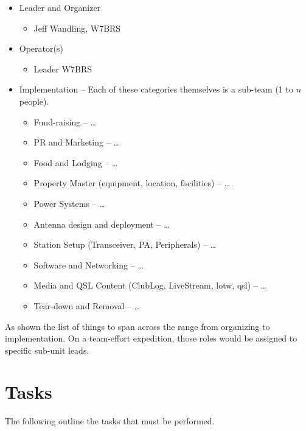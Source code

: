 \documentclass[11pt]{article}
\begin{document}
\begin{itemize}
\item Leader and Organizer
   \begin{itemize}
      \item Jeff Wandling, W7BRS
   \end{itemize}
\item Operator(s)
    \begin{itemize}
      \item Leader W7BRS
    \end{itemize}
\item Implementation -- Each of these categories themselves is a sub-team (1 
to $n$ people).
     \begin{itemize}
         \item Fund-raising --  \ldots
         \item PR and Marketing --  \ldots
         \item Food and Lodging --  \ldots
         \item Property Master (equipment, location, facilities) --  \ldots
         \item Power Systems --  \ldots
         \item Antenna design and deployment --  \ldots
         \item Station Setup (Transceiver, PA, Peripherals) --  \ldots
         \item Software and Networking --  \ldots
         \item Media and QSL Content (ClubLog, LiveStream, {\gls{lotw}},
 {\gls{qsl}}) --  \ldots
         \item Tear-down and Removal --  \ldots
     \end{itemize}
 \end{itemize}

As shown the list of things to span across the range
from organizing to implementation.  On a team-effort expedition,
those roles would be assigned to specific sub-unit leads.
\section{Tasks}

The following outline the tasks that must be performed.
\end{document}
